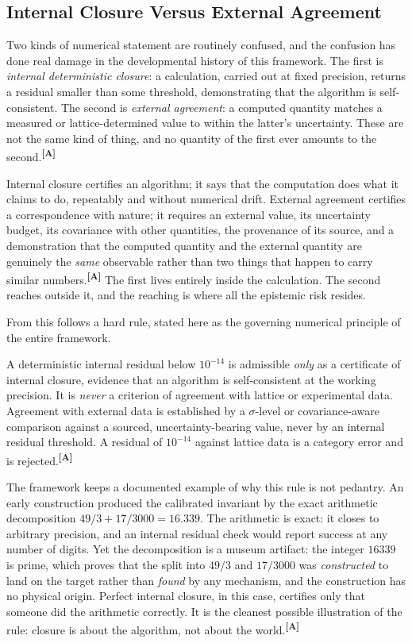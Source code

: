 \documentclass[12pt,a4paper,twoside]{article}
\theoremstyle{plain}
\theoremstyle{definition}
\theoremstyle{remark}
\newcommand{\catmark}[1]{\textsuperscript{\textsf{\textbf{[#1]}}}}
\begin{document}
\subsection{Internal Closure Versus External Agreement}
\label{subsec:closure-vs-agreement}

Two kinds of numerical statement are routinely confused, and the confusion has done real damage in the developmental history of this framework. The first is \emph{internal deterministic closure}: a calculation, carried out at fixed precision, returns a residual smaller than some threshold, demonstrating that the algorithm is self-consistent. The second is \emph{external agreement}: a computed quantity matches a measured or lattice-determined value to within the latter's uncertainty. These are not the same kind of thing, and no quantity of the first ever amounts to the second.\catmark{A}

Internal closure certifies an algorithm; it says that the computation does what it claims to do, repeatably and without numerical drift. External agreement certifies a correspondence with nature; it requires an external value, its uncertainty budget, its covariance with other quantities, the provenance of its source, and a demonstration that the computed quantity and the external quantity are genuinely the \emph{same} observable rather than two things that happen to carry similar numbers.\catmark{A} The first lives entirely inside the calculation. The second reaches outside it, and the reaching is where all the epistemic risk resides.

From this follows a hard rule, stated here as the governing numerical principle of the entire framework.

\begin{governancebox}
A deterministic internal residual below $10^{-14}$ is admissible \emph{only} as a certificate of internal closure, evidence that an algorithm is self-consistent at the working precision. It is \emph{never} a criterion of agreement with lattice or experimental data. Agreement with external data is established by a $\sigma$-level or covariance-aware comparison against a sourced, uncertainty-bearing value, never by an internal residual threshold. A residual of $10^{-14}$ against lattice data is a category error and is rejected.\catmark{A}
\end{governancebox}

\noindent The framework keeps a documented example of why this rule is not pedantry. An early construction produced the calibrated invariant by the exact arithmetic decomposition $49/3 + 17/3000 = 16.339$. The arithmetic is exact: it closes to arbitrary precision, and an internal residual check would report success at any number of digits. Yet the decomposition is a museum artifact: the integer $16339$ is prime, which proves that the split into $49/3$ and $17/3000$ was \emph{constructed} to land on the target rather than \emph{found} by any mechanism, and the construction has no physical origin. Perfect internal closure, in this case, certifies only that someone did the arithmetic correctly. It is the cleanest possible illustration of the rule: closure is about the algorithm, not about the world.\catmark{A}
\end{document}
